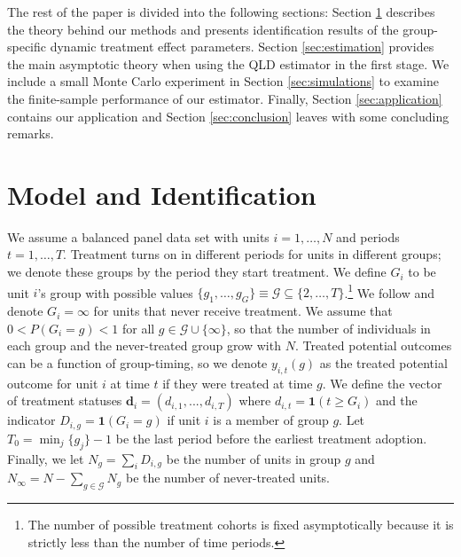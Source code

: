 \documentclass[12pt]{article}
\begin{document}
The rest of the paper is divided into the following sections: Section \ref{sec:theory} describes the theory behind our methods and presents identification results of the group-specific dynamic treatment effect parameters. Section \ref{sec:estimation} provides the main asymptotic theory when using the QLD estimator in the first stage. We include a small Monte Carlo experiment in Section \ref{sec:simulations} to examine the finite-sample performance of our estimator. Finally, Section \ref{sec:application} contains our application and Section \ref{sec:conclusion} leaves with some concluding remarks. 


\section{Model and Identification} \label{sec:theory}

We assume a balanced panel data set with units $i = 1,\dots, N$ and periods $t = 1, \dots, T$. Treatment turns on in different periods for units in different groups; we denote these groups by the period they start treatment. We define $G_i$ to be unit $i$'s group with possible values $\{ g_1, \dots, g_G \} \equiv \mathcal{G} \subseteq \{ 2, \dots, T \}$.\footnote{The number of possible treatment cohorts is fixed asymptotically because it is strictly less than the number of time periods.} We follow \citet{Callaway_Santanna_2021} and denote $G_i = \infty$ for units that never receive treatment. We assume that $0 < P(G_i = g) < 1$ for all $g \in \mathcal{G} \cup \{ \infty \}$, so that the number of individuals in each group and the never-treated group grow with $N$. Treated potential outcomes can be a function of group-timing, so we denote $y_{i,t}(g)$ as the treated potential outcome for unit $i$ at time $t$ if they were treated at time $g$. We define the vector of treatment statuses $\bm d_{i} = (d_{i,1},...,d_{i,T})$ where $d_{i,t} = \mathbf{1}(t \geq G_i)$ and the indicator $D_{i,g} = \mathbf{1}(G_i = g)$ if unit $i$ is a member of group $g$. Let $T_0 = \min_j \{ g_j \} - 1$ be the last period before the earliest treatment adoption. Finally, we let $N_g = \sum_i D_{i,g}$ be the number of units in group $g$ and $N_{\infty} = N - \sum_{g \in \mathcal{G}} N_g$ be the number of never-treated units. 

\end{document}
